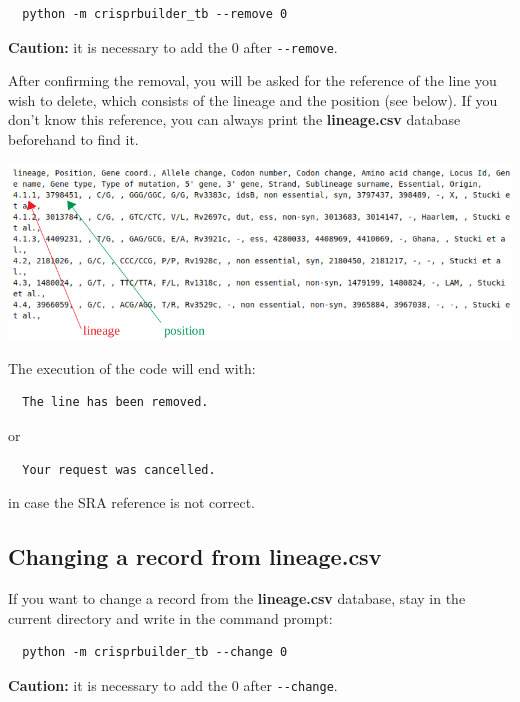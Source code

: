 \documentclass[twoside,a4paper,11pt,frenchb,openany]{report}
\begin{document}
    \begin{verbatim}
  python -m crisprbuilder_tb --remove 0
\end{verbatim}

    \textbf{Caution:} it is necessary to add the 0 after
\texttt{-\/-remove}.

After confirming the removal, you will be asked for the reference
of the line you wish to delete, which consists of the lineage and the
position (see below). If you don't know this reference, you can always
print the \textbf{lineage.csv} database beforehand to find it.

\includegraphics[width=16cm]{selection.png}

    The execution of the code will end with:

    \begin{verbatim}
  The line has been removed.
\end{verbatim}

    or

    \begin{verbatim}
  Your request was cancelled.
\end{verbatim}

    in case the SRA reference is not correct.


    \subsection{Changing a record from
lineage.csv}\label{changing-a-record-from-lineage.csv}

    If you want to change a record from the \textbf{lineage.csv} database,
stay in the current directory and write in the command
prompt:

    \begin{verbatim}
  python -m crisprbuilder_tb --change 0
\end{verbatim}

    \textbf{Caution:} it is necessary to add the 0 after
\texttt{-\/-change}.
\end{document}
